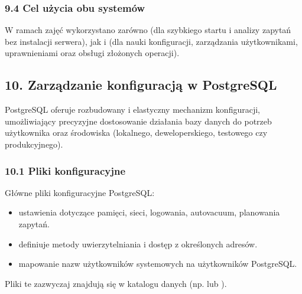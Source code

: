 \documentclass[letterpaper,10pt,polish]{sphinxmanual}
\begin{document}
\subsubsection{9.4 Cel użycia obu systemów}
\label{\detokenize{rozdzial2/Konfiguracja_baz_danych/Konfiguracja_baz_danych:cel-uzycia-obu-systemow}}
\sphinxAtStartPar
W ramach zajęć wykorzystano zarówno  (dla szybkiego startu i analizy zapytań bez instalacji serwera), jak i  (dla nauki konfiguracji, zarządzania użytkownikami, uprawnieniami oraz obsługi złożonych operacji).


\subsection{10. Zarządzanie konfiguracją w PostgreSQL}
\label{\detokenize{rozdzial2/Konfiguracja_baz_danych/Konfiguracja_baz_danych:zarzadzanie-konfiguracja-w-postgresql}}
\sphinxAtStartPar
PostgreSQL oferuje rozbudowany i elastyczny mechanizm konfiguracji, umożliwiający precyzyjne dostosowanie działania bazy danych do potrzeb użytkownika oraz środowiska (lokalnego, deweloperskiego, testowego czy produkcyjnego).


\subsubsection{10.1 Pliki konfiguracyjne}
\label{\detokenize{rozdzial2/Konfiguracja_baz_danych/Konfiguracja_baz_danych:pliki-konfiguracyjne}}
\sphinxAtStartPar
Główne pliki konfiguracyjne PostgreSQL:
\begin{itemize}
\item {} 
\sphinxAtStartPar
{} \textendash{} ustawienia dotyczące pamięci, sieci, logowania, autovacuum, planowania zapytań.

\item {} 
\sphinxAtStartPar
{} \textendash{} definiuje metody uwierzytelniania i dostęp z określonych adresów.

\item {} 
\sphinxAtStartPar
{} \textendash{} mapowanie nazw użytkowników systemowych na użytkowników PostgreSQL.

\end{itemize}

\sphinxAtStartPar
Pliki te zazwyczaj znajdują się w katalogu danych (np.  lub ).
\end{document}
